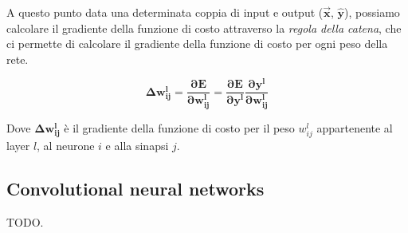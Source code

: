 A questo punto data una determinata coppia di input e output ($\mathbf{\vec{x}}$, $\mathbf{\hat{y}}$), possiamo calcolare il gradiente della funzione di costo
attraverso la \textit{regola della catena}, che ci permette di calcolare il gradiente della funzione di costo per ogni peso della rete.

\begin{equation}
    \mathbf{\Delta w^{l}_{ij} = \frac{\partial E}{\partial w^{l}_{ij}} = \frac{\partial E}{\partial y^{l}} \frac{\partial y^{l}}{\partial w^{l}_{ij}}}
\end{equation}

Dove $\mathbf{\Delta w^{l}_{ij}}$ è il gradiente della funzione di costo per il peso $w^{l}_{ij}$ appartenente al layer $l$, al neurone $i$ e alla sinapsi $j$.









\subsection{Convolutional neural networks}

    TODO.